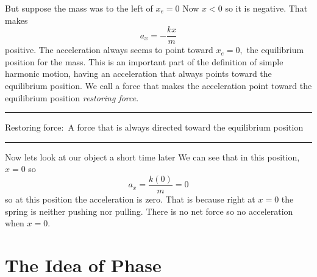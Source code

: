 \documentclass{book}
\begin{document}
But suppose the mass was to the left of $x_{e}=0$ Now $x<0$ so it is negative. That
makes 
\begin{equation*}
a_{x}=-\frac{kx}{m}
\end{equation*}%
positive. The acceleration always seems to point toward $x_{e}=0,$ the
equilibrium position for the mass. This is an important part of the
definition of simple harmonic motion, having an acceleration that always
points toward the equilibrium position. We call a force that makes the
acceleration point toward the equilibrium position \emph{restoring force}.

\begin{center}
{\small \rule{300pt}{1pt}}

{\small Restoring force:\ A force that is always directed toward the
equilibrium position}

{\small \rule{300pt}{1pt}}
\end{center}

Now lets look at our object a short time later We can see that in this position, 
$x=0$ so 
\begin{equation*}
a_{x}=\frac{k\left( 0\right) }{m}=0
\end{equation*}%
so at this position the acceleration is zero. That is because right at $x=0$
the spring is neither pushing nor pulling. There is no net force so no
acceleration when $x=0.$

\section{The Idea of Phase}
\end{document}
